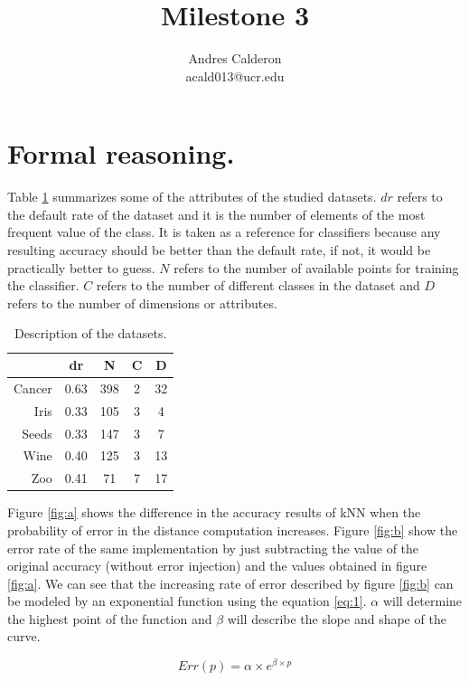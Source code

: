 \documentclass{article}
\title{Milestone 3}
\author{Andres Calderon \\ acald013@ucr.edu}
\begin{document}
\maketitle

\section{Formal reasoning.}
Table \ref{tab:desc} summarizes some of the attributes of the studied datasets. $dr$ refers to the default rate of the dataset and it is the number of elements of the most frequent value of the class.  It is taken as a reference for classifiers because any resulting accuracy should be better than the default rate, if not, it would be practically better to guess. $N$ refers to the number of available points for training the classifier. $C$ refers to the number of different classes in the dataset and $D$ refers to the number of dimensions or attributes. 

\begin{table}[h]
 \centering
 \begin{tabular}{rcccc}
  \toprule
	& \textbf{dr}	& \textbf{N}	& \textbf{C}	& \textbf{D} 	\\
  \midrule
Cancer	& 0.63	& 398	& 2	& 32 	\\
Iris	& 0.33	& 105	& 3	& 4 	\\
Seeds	& 0.33	& 147	& 3	& 7 	\\
Wine	& 0.40	& 125	& 3	& 13 	\\
Zoo	& 0.41	& 71	& 7	& 17 	\\
  \bottomrule
 \end{tabular}
 \caption{Description of the datasets.}\label{tab:desc}
\end{table}

Figure \ref{fig:a} shows the difference in the accuracy results of kNN when the probability of error in the distance computation increases. Figure \ref{fig:b} show the error rate of the same implementation by just subtracting the value of the original accuracy (without error injection) and the values obtained in figure \ref{fig:a}.  We can see that the increasing rate of error described by figure \ref{fig:b} can be modeled by an exponential function using the equation \ref{eq:1}. $\alpha$ will determine the highest point of the function and  $\beta$ will describe the slope and shape of the curve.

\begin{equation}\label{eq:1}
  Err(p) = \alpha \times e^{\beta \times p}
\end{equation}
\end{document}
